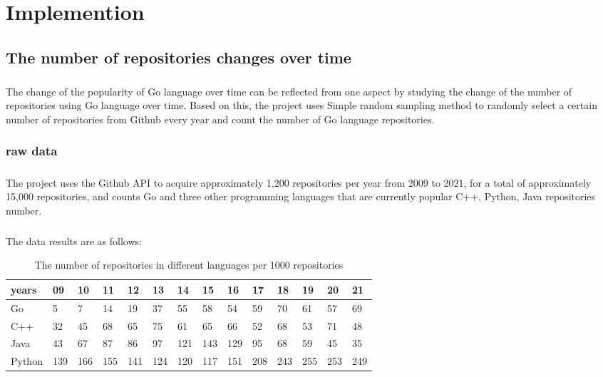 \documentclass[11pt,onside,a4paper,fleqn]{report}
\renewcommand\arraystretch{2.5}
\begin{document}
\chapter{Implemention}

\section{The number of repositories changes over time}
\paragraph{} The change of the popularity of Go language over time can be reflected from one aspect by studying the change of the number of repositories using Go language over time. Based on this, the project uses Simple random sampling method to randomly select a certain number of repositories from Github every year and count the number of Go language repositories.

\subsection{raw data}
\paragraph{} The project uses the Github API to acquire approximately 1,200 repositories per year from 2009 to 2021, for a total of approximately 15,000 repositories, and counts Go and three other programming languages that are currently popular
C++, Python, Java repositories number.

\paragraph{} The data results are as follows:

\begin{table}[ht]
\renewcommand{\arraystretch}{1.3}
\begin{tabular}{@{}llllllllllllll@{}}
\toprule
years  & 09 & 10 & 11 & 12 & 13 & 14 & 15 & 16 & 17 & 18 & 19 & 20 & 21 \\ \midrule
Go     & 5    & 7    & 14   & 19   & 37   & 55   & 58   & 54   & 59   & 70   & 61   & 57   & 69   \\
C++    & 32   & 45   & 68   & 65   & 75   & 61   & 65   & 66   & 52   & 68   & 53   & 71   & 48   \\
Java   & 43   & 67   & 87   & 86   & 97   & 121  & 143  & 129  & 95   & 68   & 59   & 45   & 35   \\
Python & 139  & 166  & 155  & 141  & 124  & 120  & 117  & 151  & 208  & 243  & 255  & 253  & 249  \\ \bottomrule
\end{tabular}
\caption{The number of repositories in different languages per 1000 repositories}
\end{table}
\end{document}
